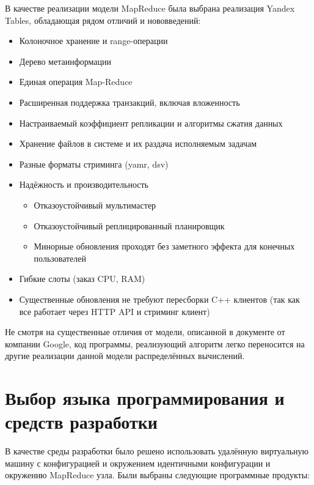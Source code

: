 В качестве реализации модели MapReduce была выбрана реализация
Yandex Tables, обладающая рядом отличий и нововведений:
\begin{itemize}
  \item Колоночное хранение и range-операции
  \item Дерево метаинформации
  \item Единая операция Map-Reduce
  \item Расширенная поддержка транзакций, включая вложенность
  \item Настраиваемый коэффициент репликации и алгоритмы сжатия данных
  \item Хранение файлов в системе и их раздача исполняемым задачам
  \item Разные форматы стриминга (yamr, dsv)
  \item Надёжность и производительность
    \begin{itemize}
      \item Отказоустойчивый мультимастер
      \item Отказоустойчивый реплицированный планировщик
      \item Минорные обновления проходят без заметного эффекта для
        конечных пользователей
    \end{itemize}
  \item Гибкие слоты (заказ CPU, RAM)
  \item Существенные обновления не требуют пересборки C++ клиентов
    (так как все работает через HTTP API и стриминг клиент)
\end{itemize}
Не смотря на существенные отличия от модели, описанной в документе от компании
Google, код программы, реализующий алгоритм легко переносится
на другие реализации данной модели распределённых вычислений.


\section{Выбор языка программирования и средств разработки}
В качестве среды разработки было решено использовать удалённую виртуальную
машину с конфигурацией и окружением идентичными конфигурации и окружению
MapReduce узла. Были выбраны следующие программные продукты:

